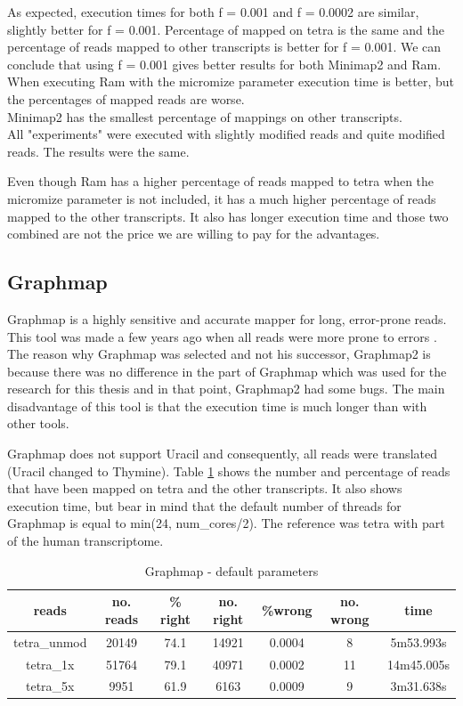 \documentclass[times, utf8, zavrsni, numeric]{fer}
\begin{document}
As expected, execution times for both f = 0.001 and f = 0.0002 are similar, slightly
better for f = 0.001. Percentage of mapped on tetra is the same and the percentage of reads
mapped to other transcripts is better for f = 0.001. We can conclude that using f = 0.001 
gives better results for both Minimap2 and Ram. \\ 
When executing Ram with the micromize parameter execution time is better, but the percentages of mapped
reads are worse. \\
Minimap2 has the smallest percentage of mappings on other transcripts. \\
All "experiments" were executed with slightly modified reads and quite modified reads. 
The results were the same. 

Even though Ram has a higher percentage of reads mapped to tetra when the micromize parameter is not
included, it has a much higher percentage of reads mapped to the other transcripts. It also has
longer execution time and those two combined are not the price we are willing to pay for the advantages.


\subsection{Graphmap}
Graphmap is a highly sensitive and accurate mapper for long, error-prone reads. 
This tool was made a few years ago when all reads were more prone to errors \cite{graphmap}. \\
The reason why Graphmap was selected and not his successor, Graphmap2 is because there 
was no difference in the part of Graphmap which was used for the research for this 
thesis and in that point, Graphmap2 had some bugs. 
The main disadvantage of this tool is that the execution time is much longer than with other tools.

Graphmap does not support Uracil and consequently, all reads were translated (Uracil changed to Thymine).
Table \ref{graphmapDefault} shows the number and percentage of reads that have been mapped on 
tetra and the other transcripts. It also shows execution time, but bear in mind that
the default number of threads for Graphmap is equal to min(24, num\_cores/2). The reference was 
tetra with part of the human transcriptome.

\begin{table}[h]
    \caption{Graphmap - default parameters}
    \centering
    \label{graphmapDefault}
    {\begin{tabular}{ccccccc}
    \hline
    \textbf{reads} & \textbf{no. reads} & \textbf{\% right} & \textbf{no. right} & \textbf{\%wrong} & \textbf{no. wrong} & \textbf{time}  \\ \hline
    tetra\_unmod & 20149 & 74.1 & 14921 & 0.0004 & 8 & 5m53.993s \\ \hline
    tetra\_1x & 51764 & 79.1 & 40971 & 0.0002 & 11 & 14m45.005s \\ \hline
    tetra\_5x & 9951 & 61.9 & 6163 & 0.0009 & 9 & 3m31.638s \\ \hline
    \end{tabular}}
\end{table}
\end{document}
